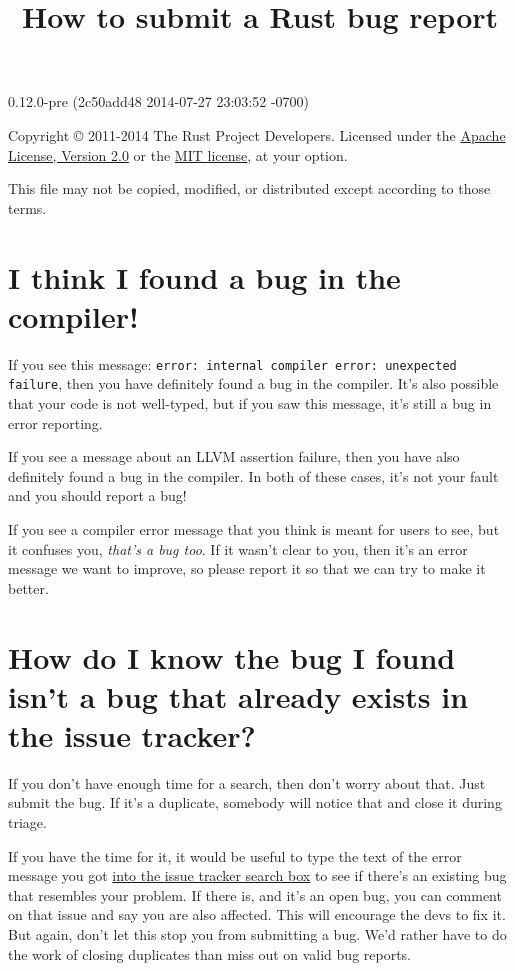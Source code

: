 \documentclass[]{article}
\title{How to submit a Rust bug report}
\begin{document}
\maketitle

0.12.0-pre (2c50add48 2014-07-27 23:03:52 -0700)

Copyright © 2011-2014 The Rust Project Developers. Licensed under the
\href{http://www.apache.org/licenses/LICENSE-2.0}{Apache License,
Version 2.0} or the \href{http://opensource.org/licenses/MIT}{MIT
license}, at your option.

This file may not be copied, modified, or distributed except according
to those terms.

{
\hypersetup{linkcolor=black}
\setcounter{tocdepth}{3}
\tableofcontents
}
\section{I think I found a bug in the
compiler!}\label{i-think-i-found-a-bug-in-the-compiler}

If you see this message:
\texttt{error: internal compiler error: unexpected failure}, then you
have definitely found a bug in the compiler. It's also possible that
your code is not well-typed, but if you saw this message, it's still a
bug in error reporting.

If you see a message about an LLVM assertion failure, then you have also
definitely found a bug in the compiler. In both of these cases, it's not
your fault and you should report a bug!

If you see a compiler error message that you think is meant for users to
see, but it confuses you, \emph{that's a bug too}. If it wasn't clear to
you, then it's an error message we want to improve, so please report it
so that we can try to make it better.

\section{How do I know the bug I found isn't a bug that already exists
in the issue
tracker?}\label{how-do-i-know-the-bug-i-found-isnt-a-bug-that-already-exists-in-the-issue-tracker}

If you don't have enough time for a search, then don't worry about that.
Just submit the bug. If it's a duplicate, somebody will notice that and
close it during triage.

If you have the time for it, it would be useful to type the text of the
error message you got
\href{https://github.com/rust-lang/rust/issues}{into the issue tracker
search box} to see if there's an existing bug that resembles your
problem. If there is, and it's an open bug, you can comment on that
issue and say you are also affected. This will encourage the devs to fix
it. But again, don't let this stop you from submitting a bug. We'd
rather have to do the work of closing duplicates than miss out on valid
bug reports.
\end{document}
